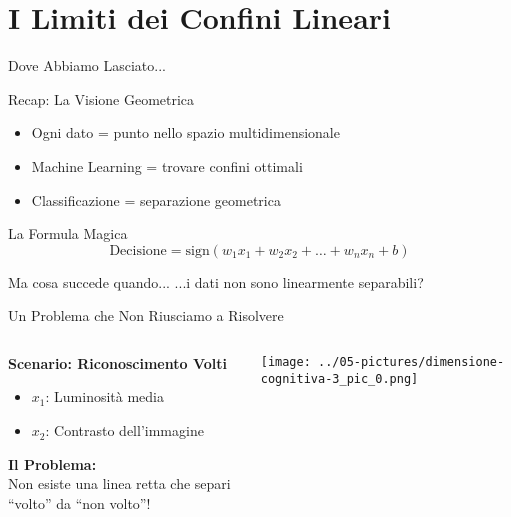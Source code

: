 \documentclass[aspectratio=169]{beamer}
\begin{document}
\section{I Limiti dei Confini Lineari}
%
%
\begin{frame}{Dove Abbiamo Lasciato...}
\begin{block}{Recap: La Visione Geometrica}
\begin{itemize}
\item Ogni dato = punto nello spazio multidimensionale
\item Machine Learning = trovare confini ottimali
\item Classificazione = separazione geometrica
\end{itemize}
\end{block}

\pause

\begin{block}{La Formula Magica}
$$\text{Decisione} = \text{sign}(w_1x_1 + w_2x_2 + \ldots + w_nx_n + b)$$
\end{block}

\pause
\begin{alertblock}{Ma cosa succede quando...}
...i dati non sono linearmente separabili?
\end{alertblock}
\end{frame}
%
%
\begin{frame}{Un Problema che Non Riusciamo a Risolvere}
\begin{columns}
\begin{column}{0.5\textwidth}
\textbf{Scenario: Riconoscimento Volti}
\begin{itemize}
\item $x_1$: Luminosità media
\item $x_2$: Contrasto dell'immagine
\end{itemize}
\vspace{.5cm}
\textbf{Il Problema:}\\
Non esiste una linea retta che separi ``volto'' da ``non volto''!
\end{column}
\begin{column}{0.5\textwidth}
\begin{center}
\texttt{[image: ../05-pictures/dimensione-cognitiva-3\_pic\_0.png]} 
\end{center}
\end{column}
\end{columns}

\end{frame}
\end{document}
